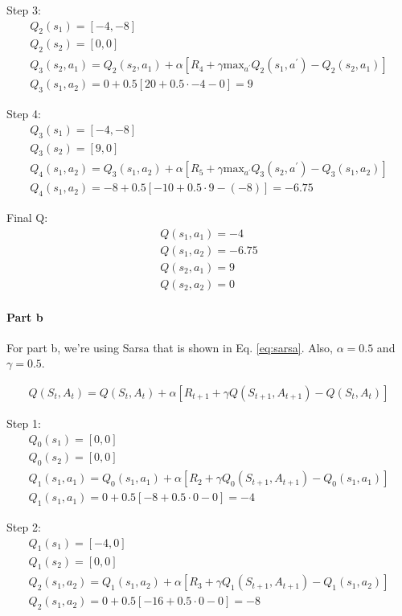\documentclass[12pt]{article}
\begin{document}
Step 3:
\begin{gather*}
  Q_2(s_1) = [-4, -8] \\
  Q_2(s_2) = [0, 0] \\
  Q_3(s_2, a_1) = Q_2(s_2, a_1) + \alpha [R_4 + \gamma \text{max}_{a^\prime} Q_2(s_1, a^\prime) - Q_2(s_2, a_1)] \\
  Q_3(s_1, a_2) = 0 + 0.5 [20 + 0.5 \cdot -4 - 0] = 9
\end{gather*}

Step 4:
\begin{gather*}
  Q_3(s_1) = [-4, -8] \\
  Q_3(s_2) = [9, 0] \\
  Q_4(s_1, a_2) = Q_3(s_1, a_2) + \alpha [R_5 + \gamma \text{max}_{a^\prime} Q_3(s_2, a^\prime) - Q_3(s_1, a_2)] \\
  Q_4(s_1, a_2) = -8 + 0.5 [-10 + 0.5 \cdot 9 - (-8)] = -6.75
\end{gather*}

Final Q:
\begin{gather*}
  Q(s_1, a_1) = -4 \\
  Q(s_1, a_2) = -6.75 \\
  Q(s_2, a_1) = 9 \\
  Q(s_2, a_2) = 0
\end{gather*}

\paragraph{Part b}

For part b, we're using Sarsa that is shown in Eq. \ref{eq:sarsa}. Also, $\alpha = 0.5$ and $\gamma = 0.5$.

\begin{gather}
  Q(S_t, A_t) = Q(S_t, A_t) + \alpha [R_{t+1} + \gamma Q(S_{t+1}, A_{t+1}) - Q(S_t, A_t)] \label{eq:sarsa}
\end{gather}

Step 1:
\begin{gather*}
  Q_0(s_1) = [0, 0] \\
  Q_0(s_2) = [0, 0] \\
  Q_1(s_1, a_1) = Q_0(s_1, a_1) + \alpha [R_2 + \gamma Q_0(S_{t+1}, A_{t+1}) - Q_0(s_1, a_1)] \\
  Q_1(s_1, a_1) = 0 + 0.5 [-8 + 0.5 \cdot 0 - 0] = -4
\end{gather*}

Step 2:
\begin{gather*}
  Q_1(s_1) = [-4, 0] \\
  Q_1(s_2) = [0, 0] \\
  Q_2(s_1, a_2) = Q_1(s_1, a_2) + \alpha [R_3 + \gamma Q_1(S_{t+1}, A_{t+1}) - Q_1(s_1, a_2)] \\
  Q_2(s_1, a_2) = 0 + 0.5 [-16 + 0.5 \cdot 0 - 0] = -8
\end{gather*}
\end{document}
